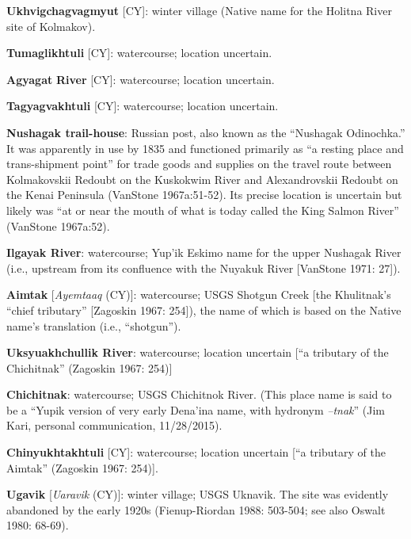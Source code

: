 \begin{hang}
\textbf{Ukhvigchagvagmyut} [CY]: winter village (Native name for the Holitna River site of Kolmakov).



\textbf{Tumaglikhtuli} [CY]: watercourse; location uncertain.



\textbf{Agyagat} \textbf{River} [CY]:\textbf{ }watercourse; location uncertain.



\textbf{Tagyagvakhtuli} [CY]: watercourse; location uncertain.



\textbf{Nushagak trail-house}: Russian post, also known as the “Nushagak Odinochka.” It was apparently in use by 1835 and functioned primarily as “a resting place and trans-shipment point” for trade goods and supplies on the travel route between Kolmakovskii Redoubt on the Kuskokwim River and Alexandrovskii Redoubt on the Kenai Peninsula (VanStone 1967a:51-52). Its precise location is uncertain but likely was “at or near the mouth of what is today called the King Salmon River” (VanStone 1967a:52).



\textbf{Ilgayak River}: watercourse; Yup’ik Eskimo name for the upper Nushagak River (i.e., upstream from its confluence with the Nuyakuk River [VanStone 1971: 27]).



\textbf{Aimtak} [\textit{Ayemtaaq} (CY)]: watercourse; USGS Shotgun Creek [the Khulitnak’s “chief tributary” [Zagoskin 1967: 254]), the name of which is based on the Native name’s translation (i.e., “shotgun”).



\textbf{Uksyuakhchullik River}: watercourse; location uncertain [“a tributary of the Chichitnak” (Zagoskin 1967: 254)]



\textbf{Chichitnak}: watercourse; USGS Chichitnok River. (This place name is said to be a “Yupik version of very early Dena’ina name, with hydronym \textit{–tnak}” (Jim Kari, personal communication, 11/28/2015).



\textbf{Chinyukhtakhtuli} [CY]: watercourse; location uncertain [“a tributary of the Aimtak” (Zagoskin 1967: 254)].



\textbf{Ugavik} [\textit{Uaravik} (CY)]: winter village; USGS Uknavik. The site was evidently abandoned by the early 1920s (Fienup-Riordan 1988: 503-504; see also Oswalt 1980: 68-69).




\end{hang}
